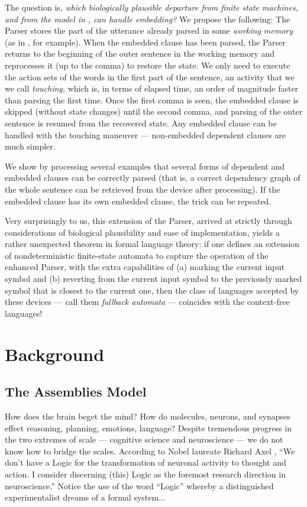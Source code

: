 \documentclass[11pt]{article}
\begin{document}
The question is, {\em which biologically plausible departure from finite state machines, and from the model in \citet{Parser}, can handle embedding?}  
We propose the following: The Parser stores the part of the utterance already parsed in some {\em working memory} (as in \citet{neuro}, for example).  When the embedded clause has been parsed, the Parser returns to the beginning of the outer sentence in the working memory and reprocesses it (up to the comma) to restore the state. We only need to execute the action sets of the words in the first part of the sentence, an activity that we we call {\em touching,} which is, in terms of elapsed time, an order of magnitude faster than parsing the first time. Once the first comma is seen, the embedded clause is skipped (without state changes) until the second comma, and parsing of the outer sentence is resumed from the recovered state. Any embedded clause can be handled with the touching maneuver --- non-embedded dependent clauses are much simpler.

We show by processing several examples that several forms of dependent and embedded clauses can be correctly parsed (that is, a correct dependency graph of the whole sentence can be retrieved from the device after processing). If the embedded clause has its own embedded clause, the trick can be repeated.

Very surprisingly to us, this extension of the Parser, arrived at strictly through considerations of biological plausibility and ease of implementation, yields a rather unexpected theorem in formal language theory: if one defines an extension of nondeterministic finite-state automata to capture the operation of the enhanced Parser, with the extra capabilities of (a) marking the current input symbol and (b) reverting from the current input symbol to the previously marked symbol that is closest to the current one, then the class of languages accepted by these devices --- call them {\em fallback automata} --- coincides with the context-free languages!

\section{Background}
\subsection{The Assemblies Model} \label{ACoverview}
How does the brain beget the mind?  How do molecules, neurons, and synapses effect reasoning, planning, emotions, language?  Despite tremendous progress in the two extremes of scale --- cognitive science and neuroscience --- we do not know how to bridge the scales.  According to Nobel laureate Richard Axel \cite{Axel}, ``We don't have a Logic for the transformation of neuronal activity to thought and action.  I consider discerning (this) Logic as the foremost research direction in neuroscience.''  Notice the use of the word ``Logic'' whereby a distinguished experimentalist dreams of a formal system...
\end{document}
